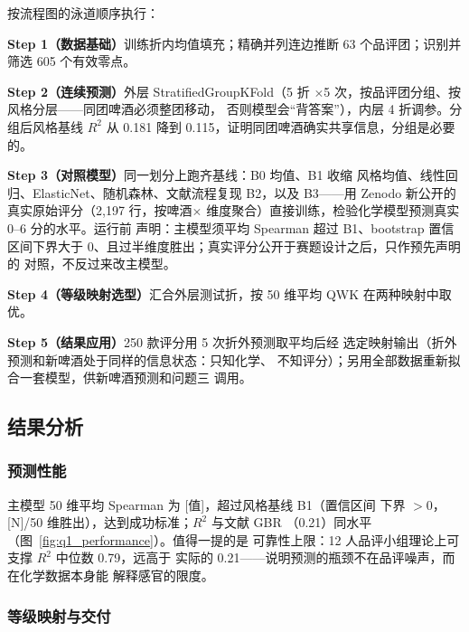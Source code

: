 \documentclass[12pt,a4paper]{article}
\begin{document}
按流程图的泳道顺序执行：

\textbf{Step 1（数据基础）}训练折内均值填充；精确并列连边推断
63 个品评团；识别并筛选 605 个有效零点。

\textbf{Step 2（连续预测）}外层 StratifiedGroupKFold（5 折
$\times$5 次，按品评团分组、按风格分层——同团啤酒必须整团移动，
否则模型会``背答案''），内层 4 折调参。分组后风格基线 $R^2$ 从
0.181 降到 0.115，证明同团啤酒确实共享信息，分组是必要的。

\textbf{Step 3（对照模型）}同一划分上跑齐基线：B0 均值、B1 收缩
风格均值、线性回归、ElasticNet、随机森林、文献流程复现 B2，以及
B3——用 Zenodo 新公开的真实原始评分（2{,}197 行，按啤酒$\times$
维度聚合）直接训练，检验化学模型预测真实 0--6 分的水平。运行前
声明：主模型须平均 Spearman 超过 B1、bootstrap 置信区间下界大于
0、且过半维度胜出；真实评分公开于赛题设计之后，只作预先声明的
对照，不反过来改主模型。

\textbf{Step 4（等级映射选型）}汇合外层测试折，按 50 维平均 QWK
在两种映射中取优。

\textbf{Step 5（结果应用）}250 款评分用 5 次折外预测取平均后经
选定映射输出（折外预测和新啤酒处于同样的信息状态：只知化学、
不知评分）；另用全部数据重新拟合一套模型，供新啤酒预测和问题三
调用。

\subsection{结果分析}

\subsubsection{预测性能}

主模型 50 维平均 Spearman 为 [值]，超过风格基线 B1（置信区间
下界 $>0$，[N]/50 维胜出），达到成功标准；$R^2$ 与文献 GBR
（0.21）同水平（图~\ref{fig:q1_performance}）。值得一提的是
可靠性上限：12 人品评小组理论上可支撑 $R^2$ 中位数 0.79，远高于
实际的 0.21——说明预测的瓶颈不在品评噪声，而在化学数据本身能
解释感官的限度。


\subsubsection{等级映射与交付}
\end{document}
